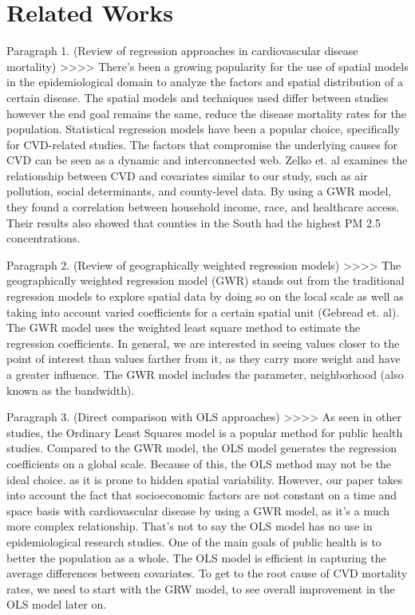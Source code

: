 \documentclass[
]{article}
\begin{document}
\section{Related Works}\label{related-works}

Paragraph 1. (Review of regression approaches in cardiovascular disease
mortality) \textgreater\textgreater\textgreater\textgreater{} There's
been a growing popularity for the use of spatial models in the
epidemiological domain to analyze the factors and spatial distribution
of a certain disease. The spatial models and techniques used differ
between studies however the end goal remains the same, reduce the
disease mortality rates for the population. Statistical regression
models have been a popular choice, specifically for CVD-related studies.
The factors that compromise the underlying causes for CVD can be seen as
a dynamic and interconnected web. Zelko et. al examines the relationship
between CVD and covariates similar to our study, such as air pollution,
social determinants, and county-level data. By using a GWR model, they
found a correlation between household income, race, and healthcare
access. Their results also showed that counties in the South had the
highest PM 2.5 concentrations.

Paragraph 2. (Review of geographically weighted regression models)
\textgreater\textgreater\textgreater\textgreater{} The geographically
weighted regression model (GWR) stands out from the traditional
regression models to explore spatial data by doing so on the local scale
as well as taking into account varied coefficients for a certain spatial
unit (Gebread et. al). The GWR model uses the weighted least square
method to estimate the regression coefficients. In general, we are
interested in seeing values closer to the point of interest than values
farther from it, as they carry more weight and have a greater influence.
The GWR model includes the parameter, neighborhood (also known as the
bandwidth).

Paragraph 3. (Direct comparison with OLS approaches)
\textgreater\textgreater\textgreater\textgreater{} As seen in other
studies, the Ordinary Least Squares model is a popular method for public
health studies. Compared to the GWR model, the OLS model generates the
regression coefficients on a global scale. Because of this, the OLS
method may not be the ideal choice. as it is prone to hidden spatial
variability. However, our paper takes into account the fact that
socioeconomic factors are not constant on a time and space basis with
cardiovascular disease by using a GWR model, as it's a much more complex
relationship. That's not to say the OLS model has no use in
epidemiological research studies. One of the main goals of public health
is to better the population as a whole. The OLS model is efficient in
capturing the average differences between covariates. To get to the root
cause of CVD mortality rates, we need to start with the GRW model, to
see overall improvement in the OLS model later on.
\end{document}
